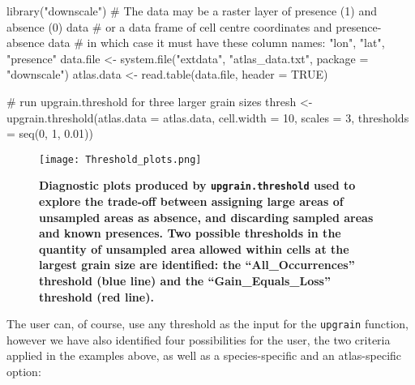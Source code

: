 \documentclass{article}[12pt, a4paper]
\begin{document}
\begin{Schunk}
\begin{Sinput}
library("downscale")
#  The data may be a raster layer of presence (1) and absence (0) data 
#  or a data frame of cell centre coordinates and presence-absence data 
#  in which case it must have these column names: "lon", "lat", "presence"
data.file <- system.file("extdata", "atlas_data.txt", package = "downscale")
atlas.data <- read.table(data.file, header = TRUE)

# run upgrain.threshold for three larger grain sizes
thresh <- upgrain.threshold(atlas.data = atlas.data,
                            cell.width = 10,
                            scales = 3,
                            thresholds = seq(0, 1, 0.01))
\end{Sinput}
\end{Schunk}
                            
\begin{figure}[ht]
\centering
\texttt{[image: Threshold\_plots.png]}
\caption{\textbf{Diagnostic plots produced by \texttt{upgrain.threshold} used to explore the trade-off  between assigning large areas of unsampled areas as absence, and discarding sampled areas and known presences. Two possible thresholds in the quantity of unsampled area allowed within cells at the largest grain size are identified: the “All\_Occurrences” threshold (blue line) and the “Gain\_Equals\_Loss” threshold (red line).}}
\label{fig:Threshold plots}
\end{figure}

The user can, of course, use any threshold as the input for the \texttt{upgrain} function, however we have also identified four possibilities for the user, the two criteria applied in the examples above, as well as a species-specific and an atlas-specific option: 
\end{document}
